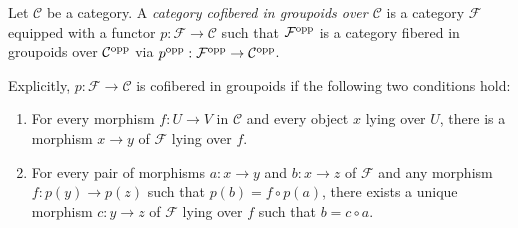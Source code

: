 \begin{definition}
\label{definition-category-cofibred-groupoids}
Let $\mathcal C$ be a category.  A {\it category cofibered in groupoids over 
$\mathcal C$} is a category $\mathcal F$ equipped with a functor $p: \mathcal F 
\rightarrow \mathcal C$ such that $\mathcal F^{\textnormal{opp}}$ is a category 
fibered in groupoids over $\mathcal C^{\textnormal{opp}}$ via 
$p^{\textnormal{opp}}: \mathcal F^{\textnormal{opp}} \rightarrow \mathcal 
C^{\textnormal{opp}}$.
\end{definition}

\noindent
Explicitly, $p: \mathcal F \rightarrow \mathcal C$ is cofibered in groupoids if 
the following two conditions hold:
\begin{enumerate}
\item For every morphism $f: U \rightarrow V$ in $\mathcal C$ and every object 
$x$ lying over $U$, there is a morphism $x \rightarrow y$ of $\mathcal F$ lying 
over $f$.
\item For every pair of morphisms $a: x \rightarrow y$ and $b: x \rightarrow z$ 
of $\mathcal F$ and any morphism $f: p(y) \rightarrow p(z)$ such that $p(b) = f 
\circ p(a)$, there exists a unique morphism $c: y \rightarrow z$ of $\mathcal 
F$ lying over $f$ such that $b = c \circ a$.
\end{enumerate}

